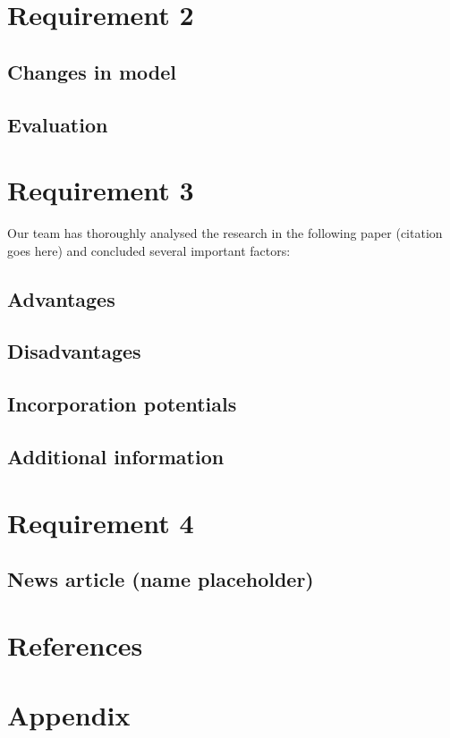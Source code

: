 \documentclass[12pt]{article}
\begin{document}
\section{Requirement 2}
\subsection{Changes in model}

\subsection{Evaluation}


\section{Requirement 3}
Our team has thoroughly analysed the research in the following paper (citation goes here) and concluded several important factors:
\subsection{Advantages}

\subsection{Disadvantages}

\subsection{Incorporation potentials}

\subsection{Additional information}


\section{Requirement 4}
\subsection{News article (name placeholder)}


\section{References}


\section{Appendix}
\end{document}

